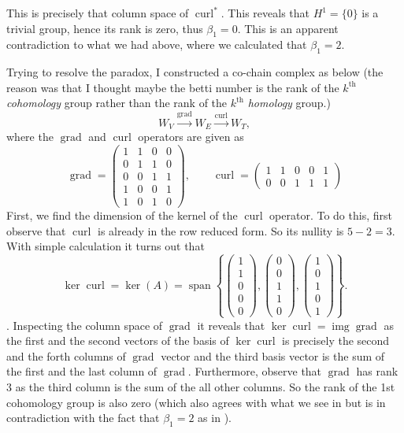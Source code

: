 \documentclass[11pt,a4paper]{article}
\newcommand{\grad}{\operatorname{grad}}
\newcommand{\curl}{\operatorname{curl}}
\newcommand{\img}{\operatorname{img}}
\begin{document}
	This is precisely that column space of $ \curl^* $. This reveals that $ H^1 = \{0\} $ is a trivial group, hence its rank is zero, thus $ \beta_1 = 0 $. This is an apparent contradiction to what we had above, where we calculated that $ \beta_1 = 2 $.
	
	Trying to resolve the paradox, I constructed a co-chain complex as below (the reason was that I thought maybe the betti number is the rank of the $ k^\text{th} $ \emph{cohomology} group rather than the rank of the $ k^\text{th} $ \emph{homology} group.)
	\[ W_V \xrightarrow{\grad} W_E \xrightarrow{\curl} W_T, \]
	where the $ \grad $ and $ \curl $ operators are given as
	\[ \grad = \begin{pmatrix}
		1 & 1 & 0 & 0 \\
		0 & 1 & 1 & 0 \\
		0 & 0 & 1 & 1 \\
		1 & 0 & 0 & 1 \\ 
		1 & 0 & 1 & 0
	\end{pmatrix}, \qquad
	\curl = \begin{pmatrix}
		1 & 1 & 0 & 0 & 1 \\
		0 & 0 & 1 & 1 & 1
	\end{pmatrix} \]
	First, we find the dimension of the kernel of the $ \curl $ operator. To do this, first observe that $ \curl $ is already in the row reduced form. So its nullity is $ 5 -  2 = 3 $. With simple calculation it turns out that
	\[ \ker \curl =
	\ker(A) = \operatorname{span} \left\{
	\begin{pmatrix}
		1 \\ 1 \\ 0 \\ 0 \\ 0
	\end{pmatrix},
	\begin{pmatrix}
		0 \\ 0 \\ 1 \\ 1 \\ 0
	\end{pmatrix},
	\begin{pmatrix}
		1 \\ 0 \\ 1 \\ 0 \\ 1
	\end{pmatrix}
	\right\}.
	\].
	Inspecting the column space of $ \grad $ it reveals that $ \ker \curl = \img \grad $ as the first and the second vectors of the basis of $ \ker \curl $ is precisely the second and the forth columns of $ \grad $ vector and the third basis vector is the sum of the first and the last column of $ \grad $. Furthermore, observe that $ \grad $ has rank 3 as the third column is the sum of the all other columns. So the rank of the 1st cohomology group is also zero (which also agrees with what we see in \cite{Lim2019} but is in contradiction with the fact that $ \beta_1 = 2 $ as in \cite{Gross2005}).
	
\end{document}
